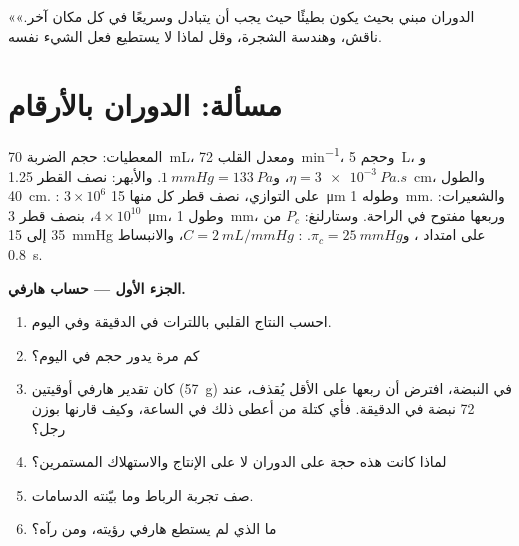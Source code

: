 \begin{exercise}[$\star\star\star$]\label{exo:b2:blood-circulation:12}
«الدوران مبني بحيث يكون  بطيئًا حيث يجب أن
يتبادل وسريعًا في كل مكان آخر.» ناقش،   وهندسة الشجرة، وقل
لماذا لا يستطيع  فعل الشيء نفسه.
\end{exercise}

\section{مسألة: الدوران بالأرقام}

\begin{problem}
\label{pb:b2:blood-circulation:1}
المعطيات: حجم الضربة \qty{70}{mL}، ومعدل القلب \qty{72}{min^{-1}}،
وحجم  \qty{5}{L}، و$\eta = \qty{3e-3}{Pa.s}$، و$\qty{1}{mmHg} =
\qty{133}{Pa}$. والأبهر: نصف القطر \qty{1.25}{cm}، والطول \qty{40}{cm}.
: $3\times 10^{6}$ على التوازي، نصف قطر كل منها
\qty{15}{\micro m} وطوله \qty{1}{mm}. والشعيرات: $4\times
10^{10}$، بنصف قطر \qty{3}{\micro m}، وطول \qty{1}{mm}، وربعها
مفتوح في الراحة. وستارلنغ: $P_c$ من 35 إلى \qty{15}{mmHg} على امتداد
، و$\pi_c = \qty{25}{mmHg}$. : $C =
\qty{2}{mL/mmHg}$، والانبساط \qty{0.8}{s}.

\medskip
\noindent\textbf{الجزء الأول --- حساب هارفي.}
\begin{enumerate}
  \item احسب النتاج القلبي باللترات في الدقيقة وفي اليوم.
  \item كم مرة يدور حجم  في اليوم؟
  \item كان تقدير هارفي أوقيتين (\qty{57}{g}) في النبضة،
        افترض أن ربعها على الأقل يُقذف، عند 72 نبضة
        في الدقيقة. فأي كتلة من  أعطى ذلك في الساعة، وكيف
        قارنها بوزن رجل؟
  \item لماذا كانت هذه حجة على الدوران لا على
        الإنتاج والاستهلاك المستمرين؟
  \item صف تجربة الرباط وما بيّنته الدسامات.
  \item ما الذي لم يستطع هارفي رؤيته، ومن رآه؟
\end{enumerate}


\end{problem}
